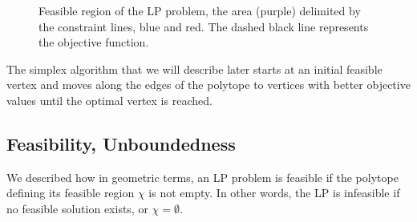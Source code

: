 \begin{figure}
    \centering
    \caption{Feasible region of the LP problem, the area (purple) delimited by the constraint lines, blue and red. The dashed black line represents the objective function.}
\end{figure}\label{fig:lp_geom}

The simplex algorithm that we will describe later starts at an initial feasible vertex and moves along the edges of the polytope to vertices with better objective values until the optimal vertex is reached.

\subsection{Feasibility, Unboundedness}\label{feasibility}
We described how in geometric terms, an LP problem is feasible if the polytope defining its feasible region $ \chi $ is not empty. In other words, the LP is infeasible if no feasible solution exists, or $\chi = \emptyset$.

